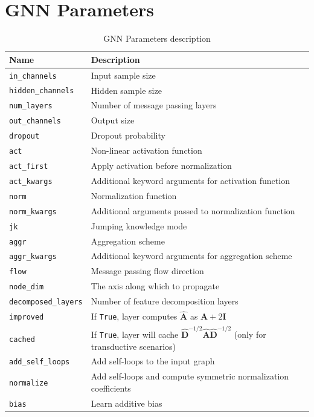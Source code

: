 \section{\ac{GNN} Parameters}

\begin{table}[ht!]
	\centering
	\caption{\ac{GNN} Parameters description}
	\begin{tabular}{lp{8cm}}
		\toprule
		\textbf{Name} & \textbf{Description} \\
		\midrule
		\texttt{in\_channels} & Input sample size \\
		\texttt{hidden\_channels} & Hidden sample size\\
		\texttt{num\_layers} & Number of message passing layers  \\
		\texttt{out\_channels} & Output size \\
		\texttt{dropout} & Dropout probability \\
		\texttt{act} & Non-linear activation function \\
		\texttt{act\_first} & Apply activation before normalization \\
		\texttt{act\_kwargs} & Additional keyword arguments for activation function \\
		\texttt{norm} & Normalization function \\
		\texttt{norm\_kwargs} & Additional arguments passed to normalization function \\
		\texttt{jk} & Jumping knowledge mode \\
		\texttt{aggr} & Aggregation scheme \\
		\texttt{aggr\_kwargs} & Additional keyword arguments for aggregation scheme \\
		\texttt{flow} & Message passing flow direction \\
		\texttt{node\_dim} & The axis along which to propagate \\
		\texttt{decomposed\_layers} & Number of feature decomposition layers\\
		
		\texttt{improved} & If \texttt{True}, layer computes $\mathbf{\hat{A}}$ as $\mathbf{A} + 2\mathbf{I}$ \\
		\texttt{cached} & If \texttt{True}, layer will cache $\mathbf{\hat{D}}^{-1/2} \mathbf{\hat{A}} \mathbf{\hat{D}}^{-1/2}$ (only for transductive scenarios) \\
		\texttt{add\_self\_loops} & Add self-loops to the input graph \\
		\texttt{normalize} & Add self-loops and compute symmetric normalization coefficients \\
		\texttt{bias} & Learn additive bias \\
	

\end{tabular}
\end{table}
